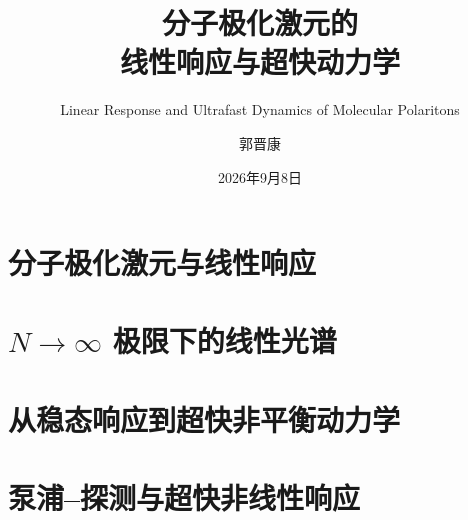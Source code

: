 \documentclass[dvipsnames]{beamer}
\title{{\fontsize{22}{25}\selectfont
  分子极化激元的\\线性响应与超快动力学}}
\subtitle{Linear Response and Ultrafast Dynamics of Molecular Polaritons}
\author{郭晋康}
\date{2026年9月8日}
\begin{document}
\maketitle

\section{分子极化激元与线性响应}


\section{\texorpdfstring{$N\to\infty$}{N to infinity} 极限下的线性光谱}


\section{从稳态响应到超快非平衡动力学}


\section{泵浦--探测与超快非线性响应}



\end{document}
